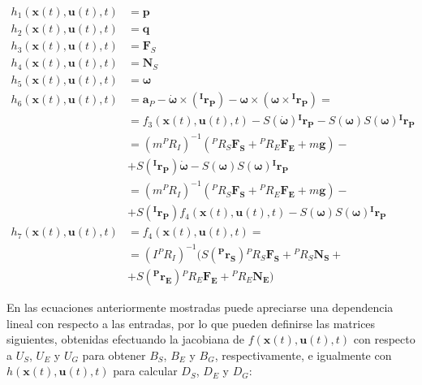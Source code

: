 \begin{subequations}
\begin{align}
	h_1(\boldsymbol{x}(t),\boldsymbol{u}(t),t) &= \boldsymbol{p} \\
	h_2(\boldsymbol{x}(t),\boldsymbol{u}(t),t) &= \boldsymbol{q} \\
	h_3(\boldsymbol{x}(t),\boldsymbol{u}(t),t) &= \boldsymbol{F}_S \\
	h_4(\boldsymbol{x}(t),\boldsymbol{u}(t),t) &= \boldsymbol{N}_S \\
	h_5(\boldsymbol{x}(t),\boldsymbol{u}(t),t) &= \boldsymbol{\omega} \\
	h_6(\boldsymbol{x}(t),\boldsymbol{u}(t),t) &= 
		\boldsymbol{a}_P -
		\boldsymbol{\dot{\omega}}\times(\boldsymbol{^Ir_P}) -
		\boldsymbol{\omega}\times(\boldsymbol{\omega}\times\boldsymbol{^Ir_P}) =
		\nonumber \\ &=
		f_3(\boldsymbol{x}(t),\boldsymbol{u}(t),t) - 
		S(\boldsymbol{\dot{\omega}})\boldsymbol{^Ir_P} -
		S(\boldsymbol{\omega})S(\boldsymbol{\omega})\boldsymbol{^Ir_P} 
		\nonumber \\ &=
		(m{^PR_I})^{-1}
		({^PR_S}\boldsymbol{F_S} + {^PR_E}\boldsymbol{F_E} + m\boldsymbol{g}) -
		\nonumber \\ &+
		S(\boldsymbol{^Ir_P})\boldsymbol{\dot{\omega}} -
		S(\boldsymbol{\omega})S(\boldsymbol{\omega})\boldsymbol{^Ir_P}
		\nonumber \\ &=
		(m{^PR_I})^{-1}
		({^PR_S}\boldsymbol{F_S} + {^PR_E}\boldsymbol{F_E} + m\boldsymbol{g}) -
		\nonumber \\ &+
		S(\boldsymbol{^Ir_P})f_4(\boldsymbol{x}(t),\boldsymbol{u}(t),t) -
		S(\boldsymbol{\omega})S(\boldsymbol{\omega})\boldsymbol{^Ir_P} \\
	h_7(\boldsymbol{x}(t),\boldsymbol{u}(t),t) &= f_4(\boldsymbol{x}(t),
		\boldsymbol{u}(t),t) = \nonumber \\ &=
		(I {^PR_I})^{-1}
		(S(\boldsymbol{^Pr_S}){^PR_S}\boldsymbol{F_S}+ {^PR_S}\boldsymbol{N_S} +
		\nonumber\\
		 &+ S(\boldsymbol{^Pr_E}){^PR_E}\boldsymbol{F_E} + {^PR_E}\boldsymbol{N_E})
\end{align}
\end{subequations}

En las ecuaciones anteriormente mostradas puede apreciarse una dependencia lineal con respecto a las entradas, por lo que pueden definirse las matrices siguientes, obtenidas efectuando la jacobiana de $f(\boldsymbol{x}(t),\boldsymbol{u}(t),t)$ con respecto a $U_S$, $U_E$ y $U_G$ para obtener $B_S$, $B_E$ y $B_G$, respectivamente, e igualmente con $h(\boldsymbol{x}(t),\boldsymbol{u}(t),t)$ para calcular $D_S$, $D_E$ y $D_G$:

